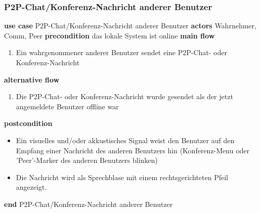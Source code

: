 \subsubsection{P2P-Chat/Konferenz-Nachricht anderer Benutzer}\label{subsubsec:uc_watchmsgbypeer}
\noindent \textbf{use case} P2P-Chat/Konferenz-Nachricht anderer Benutzer \newline
\indent \textbf{actors} \newline
\indent \indent Wahrnehmer, Comm, Peer \newline
\indent \textbf{precondition} \newline
\indent \indent das lokale System ist online \newline
\indent \textbf{main flow}
\begin{enumerate}[labelwidth=0pt,leftmargin=39pt,noitemsep,topsep=0pt,parsep=0pt,partopsep=0pt]
\item Ein wahrgenommener anderer Benutzer sendet eine P2P-Chat- oder Konferenz-Nachricht
\end{enumerate}
\indent \indent \textbf{alternative flow}
\begin{enumerate}[labelwidth=0pt,leftmargin=39pt,noitemsep,topsep=0pt,parsep=0pt,partopsep=0pt]
\item Die P2P-Chat- oder Konferenz-Nachricht wurde gesendet als der jetzt angemeldete Benutzer offline war
\end{enumerate}
\indent \indent \textbf{postcondition}
\begin{itemize}[label={},labelwidth=0pt,leftmargin=24pt,noitemsep,topsep=0pt,parsep=0pt,partopsep=0pt]
\item Ein visuelles und/oder akkustisches Signal weist den Benutzer auf den Empfang einer Nachricht des anderen Benutzers hin (Konferenz-Menu oder 'Peer'-Marker des anderen Benutzers blinken)
\item Die Nachricht wird als Sprechblase mit einem rechtsgerichteten Pfeil angezeigt.
\end{itemize}
\noindent \textbf{end} P2P-Chat/Konferenz-Nachricht anderer Benutzer

\newpage
